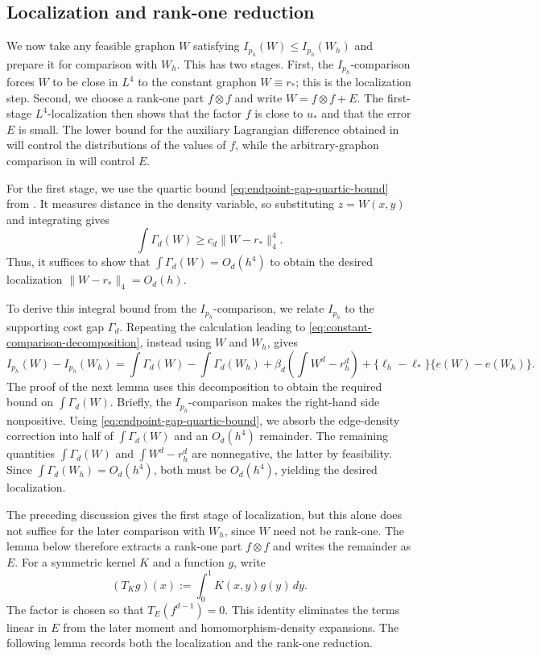 \subsection{Localization and rank-one reduction}
\label{sec:localization-rank-one}

We now take any feasible graphon $W$ satisfying
$I_{p_h}(W)\le I_{p_h}(W_h)$ and prepare it for comparison with $W_h$.
This has two stages.  First, the $I_{p_h}$-comparison forces $W$ to be close
in $L^4$ to the constant graphon $W\equiv r_*$; this is the localization
step.  Second, we choose a rank-one part $f\otimes f$ and write
$W=f\otimes f+E$.  The first-stage $L^4$-localization then shows that the factor
$f$ is close to $u_*$ and that the error $E$ is small.  The lower bound for
the auxiliary Lagrangian difference obtained in
 will control the distributions of
the values of $f$, while the arbitrary-graphon comparison in
 will control $E$.

For the first stage, we use the quartic bound
\eqref{eq:endpoint-gap-quartic-bound} from .
It measures distance in the density variable, so substituting $z=W(x,y)$
and integrating gives
\[
  \int\Gamma_d(W)\ge c_d\|W-r_*\|_4^4.
\]
Thus, it suffices to show that $\int\Gamma_d(W)=O_d(h^4)$ to obtain the
desired localization $\|W-r_*\|_4=O_d(h)$.

To derive this integral bound from the $I_{p_h}$-comparison, we relate
$I_{p_h}$ to the supporting cost gap $\Gamma_d$.  Repeating the calculation leading to
\eqref{eq:constant-comparison-decomposition}, instead using $W$ and $W_h$, gives
\begin{equation}\label{eq:graphon-cost-decomposition}
  I_{p_h}(W)-I_{p_h}(W_h)
  =\int\Gamma_d(W)-\int\Gamma_d(W_h)
  +\beta_d\left(\int W^d-r_h^d\right)
  +\{\ell_h-\ell_*\}\{e(W)-e(W_h)\}.
\end{equation}
The proof of the next lemma uses this decomposition to obtain the required
bound on $\int\Gamma_d(W)$.
Briefly, the $I_{p_h}$-comparison makes the right-hand side nonpositive.
Using \eqref{eq:endpoint-gap-quartic-bound}, we absorb the edge-density
correction into half of $\int\Gamma_d(W)$ and an $O_d(h^4)$ remainder.
The remaining quantities $\int\Gamma_d(W)$ and $\int W^d-r_h^d$ are
nonnegative, the latter by feasibility.  Since $\int\Gamma_d(W_h)=O_d(h^4)$,
both must be $O_d(h^4)$, yielding the desired localization.

The preceding discussion gives the first stage of localization, but this
alone does not suffice for the later comparison with $W_h$, since $W$ need
not be rank-one.  The lemma below therefore extracts a
rank-one part $f\otimes f$ and writes the remainder as $E$.  For a symmetric
kernel $K$ and a function $g$, write
\[
  (T_Kg)(x):=\int_0^1K(x,y)g(y)\,dy.
\]
The factor is chosen so that $T_E(f^{d-1})=0$.  This identity eliminates the
terms linear in $E$ from the later moment and homomorphism-density expansions.
The following lemma records both the localization and the rank-one reduction.

